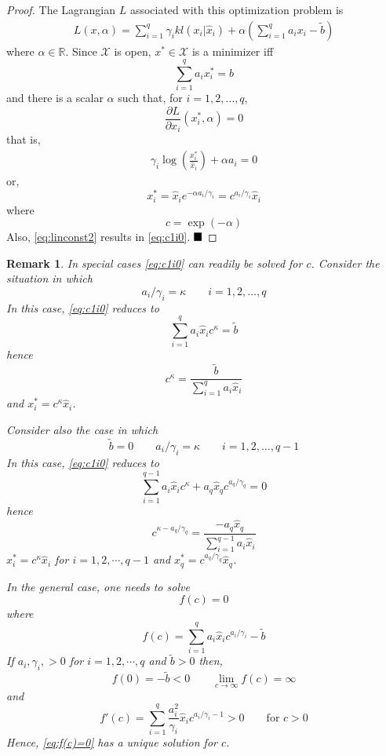 \documentclass[twocolumn]{article}
\newtheorem{remark}{Remark}
\def\qed{ \rule{.1in}{.1in}}
\begin{document}
\begin{proof}
The Lagrangian $L$  associated with this optimization  problem is 
\begin{align*}
 L(x,\alpha)=
  \sum_{i =1}^q  \gamma_ikl(x_i| \hat{x}_i) 
+ \alpha \left(\sum_{i=1}^q  a_ix_i -\tilde{b} \right)
\end{align*}
where $\alpha \in \mathbb{R}$.
Since ${\mathcal X}$ is open, $x^* \in {\mathcal X}$ is a minimizer 
iff
\begin{equation}
\label{eq:linconst2}
 \sum_{i=1}^q a_i x^*_i = b
\end{equation}
and there is a scalar $\alpha$ such that, for $i=1,2,\dots, q$,
\[
\frac{\partial L}{\partial x_i} (x^*_i, \alpha)  =0 
\]
that is,
\begin{align*}
     \gamma_i \log \left( \frac{x^*_i}{\hat{x}_i}  \right)  +\alpha a_i  =0 
\end{align*}
or,
\[
x^*_i = \hat{x}_i e^{-\alpha a_i/\gamma_i} =c^{a_i/\gamma_i} \hat{x}_i 
\]
where
\[
 c = \exp(   -\alpha )
\]
Also, \eqref{eq:linconst2} 
results in \eqref{eq:c1i0}.
\hfill$\qed$
\end{proof}

\begin{remark}
\label{rem:f(c) = 0}
In special cases \eqref{eq:c1i0} can readily be solved for $c$.
Consider the situation in which
\[
a_i/\gamma_i = \kappa \qquad i=1,2, \dots, q
\]
In this case, \eqref{eq:c1i0} reduces to
\[
\sum_{i=1}^q a_i \hat{x}_ic^\kappa  = \tilde{b}
\]
hence
\[
c^\kappa = \frac{\tilde b}{\sum_{i=1}^q a_{i} \hat{x}_i}
\]
and
$x^*_i = c^\kappa \hat{x}_i$.

Consider also the case in which
\[
\tilde{b}= 0 \qquad a_i/\gamma_i = \kappa \qquad i=1,2, \dots, q-1
\]
In this case, \eqref{eq:c1i0} reduces to
\[
\sum_{i=1}^{q-1} a_{i} \hat{x}_ic^\kappa  + a_q \hat{x}_q c^{a_q/\gamma_q}  = 0
\]
hence
\[
c^{\kappa -a_q/\gamma_q} = \frac{-a_q\hat{x}_q}{\sum_{i=1}^{q-1} a_{i} \hat{x}_i}
\]
$x^*_i = c^\kappa \hat{x}_i$ for $i=1,2, \cdots, q-1$
and $x^*_q = c^{a_q/\gamma_q} \hat{x}_q$.

In the general case, one needs to solve
\begin{equation}
\label{eq:f(c)=0}
f(c) =0
\end{equation}
where
\[
f(c) =  {\sum_{i=1}^q a_{i}\hat{x}_i}c^{a_i/\gamma_i} -\tilde{b}
\]
If $a_i,\gamma_i,  >0$ for $i=1,2, \cdots, q$ and $\tilde{b}>0$ then, 
\[
f(0) =  -\tilde{b} <0 \qquad 
\lim_{c\rightarrow \infty} f(c) = \infty
\]
and
\[
f'(c)  = {\sum_{i=1}^q  \frac{a_i^2}{ \gamma_i} \hat{x}_i} c^{a_i/\gamma_i\!-\!1} >0 \qquad \text{for } c>0
\]
Hence, \eqref{eq:f(c)=0} has a unique solution for $c$.

\end{remark}
\end{document}
